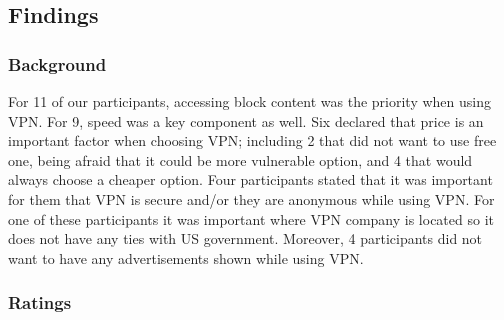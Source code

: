 \subsection{Findings}\label{sec:results}

\subsubsection{Background}

For 11 of our participants, accessing block content was the priority when
using VPN. For 9, speed was a key component as well. Six declared that price
is an important factor when choosing VPN; including 2 that did not want to use
free one, being afraid that it could be more vulnerable option, and 4 that
would always choose a cheaper option. Four participants stated that it was
important for them that VPN is secure and/or they are anonymous while using
VPN. For one of these participants it was important where VPN company is
located so it does not have any ties with US government.  Moreover, 4
participants did not want to have any advertisements shown while using VPN. 

\subsubsection{Ratings}

